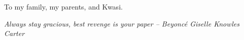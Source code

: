 %
\begin{frontmatter}

%
%
\makefrontmatter

%
%
%
%
%
%
\begin{dedication}
  To my family, my parents, and Kwasi.
\end{dedication}


%
%



%
%
\begin{epigraph} %
  \emph{Always stay gracious, best revenge is your paper -- Beyonc\'e Giselle Knowles Carter}
\end{epigraph}

%


%
\tableofcontents



\end{frontmatter}
